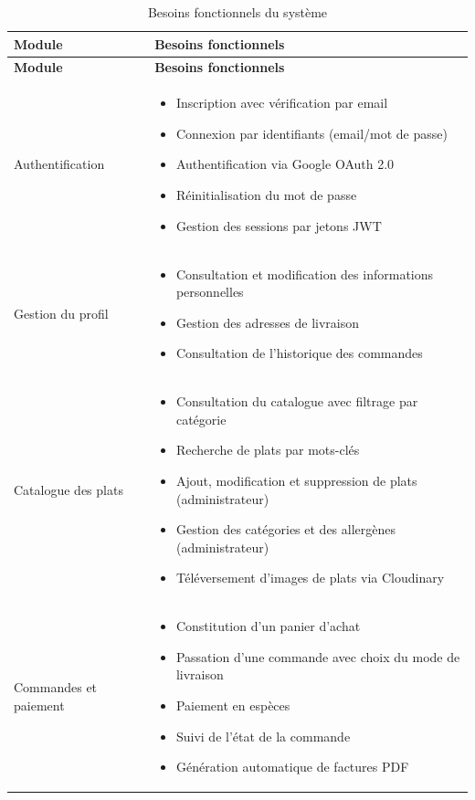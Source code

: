\begin{longtable}{|p{3.5cm}|p{9cm}|}
    \caption{Besoins fonctionnels du système} \label{tab:besoins_fonctionnels} \\
    \hline
    \textbf{Module} & \textbf{Besoins fonctionnels} \\
    \hline
    \endfirsthead
    \hline
    \textbf{Module} & \textbf{Besoins fonctionnels} \\
    \hline
    \endhead
    \hline
    \endfoot

    Authentification &
    \begin{itemize}
        \item Inscription avec vérification par email
        \item Connexion par identifiants (email/mot de passe)
        \item Authentification via Google OAuth 2.0
        \item Réinitialisation du mot de passe
        \item Gestion des sessions par jetons JWT
    \end{itemize} \\
    \hline

    Gestion du profil &
    \begin{itemize}
        \item Consultation et modification des informations personnelles
        \item Gestion des adresses de livraison
        \item Consultation de l'historique des commandes
    \end{itemize} \\
    \hline

    Catalogue des plats &
    \begin{itemize}
        \item Consultation du catalogue avec filtrage par catégorie
        \item Recherche de plats par mots-clés
        \item Ajout, modification et suppression de plats (administrateur)
        \item Gestion des catégories et des allergènes (administrateur)
        \item Téléversement d'images de plats via Cloudinary
    \end{itemize} \\
    \hline

    Commandes et paiement &
    \begin{itemize}
        \item Constitution d'un panier d'achat
        \item Passation d'une commande avec choix du mode de livraison
        \item Paiement en espèces
        \item Suivi de l'état de la commande
        \item Génération automatique de factures PDF
    \end{itemize} \\
    \hline


\end{longtable}
